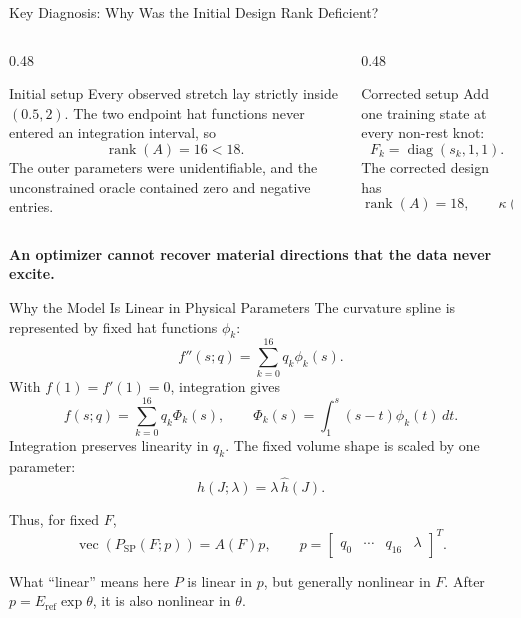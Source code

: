 \documentclass[aspectratio=169,10pt]{beamer}
\newcommand{\vect}[1]{\operatorname{vec}\!\left(#1\right)}
\newcommand{\eref}{E_{\mathrm{ref}}}
\begin{document}
\begin{frame}{Key Diagnosis: Why Was the Initial Design Rank Deficient?}
  \small
  \begin{columns}[T]
    \begin{column}{0.48\linewidth}
      \begin{alertblock}{Initial setup}
        Every observed stretch lay strictly inside $(0.5,2)$. The two endpoint
        hat functions never entered an integration interval, so
        \[
          \operatorname{rank}(A)=16<18.
        \]
        The outer parameters were unidentifiable, and the unconstrained oracle
        contained zero and negative entries.
      \end{alertblock}
    \end{column}
    \begin{column}{0.48\linewidth}
      \begin{block}{Corrected setup}
        Add one training state at every non-rest knot:
        \[
          F_k=\operatorname{diag}(s_k,1,1).
        \]
        The corrected design has
        \[
          \operatorname{rank}(A)=18,
          \qquad
          \kappa(A)=800.3.
        \]
      \end{block}
    \end{column}
  \end{columns}

  \vspace{0.7em}
  \centering
  \textbf{An optimizer cannot recover material directions that the data never excite.}
\end{frame}

\begin{frame}{Why the Model Is Linear in Physical Parameters}
  \small
  The curvature spline is represented by fixed hat functions $\phi_k$:
  \[
    f''(s;q)=\sum_{k=0}^{16}q_k\phi_k(s).
  \]
  With $f(1)=f'(1)=0$, integration gives
  \[
    f(s;q)
    =
    \sum_{k=0}^{16}q_k\Phi_k(s),
    \qquad
    \Phi_k(s)=\int_1^s(s-t)\phi_k(t)\,dt.
  \]
  Integration preserves linearity in $q_k$. The fixed volume shape is scaled
  by one parameter:
  \[
    h(J;\lambda)=\lambda\,\widehat h(J).
  \]

  Thus, for fixed $F$,
  \[
    \boxed{
      \vect{P_{\mathrm{SP}}(F;p)}=A(F)p,
      \qquad
      p=\begin{bmatrix}q_0&\cdots&q_{16}&\lambda\end{bmatrix}^T
    }.
  \]

  \begin{alertblock}{What ``linear'' means here}
    $P$ is linear in $p$, but generally nonlinear in $F$. After
    $p=\eref\exp\theta$, it is also nonlinear in $\theta$.
  \end{alertblock}
\end{frame}
\end{document}
